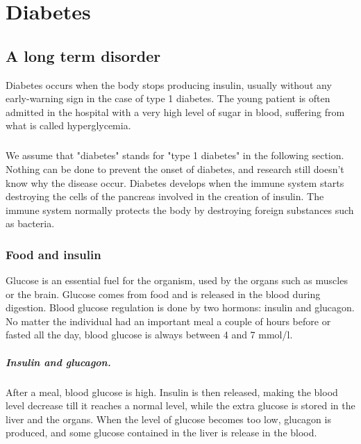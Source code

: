 \chapter{Diabetes}

\section{A long term disorder}%
Diabetes occurs when the body stops producing insulin, usually without any early-warning sign in the case of type 1 diabetes. The young patient is often admitted in the hospital with a very high level of sugar in blood, suffering from what is called hyperglycemia.
\paragraph{}

We assume that "diabetes" stands for "type 1 diabetes" in the following section. Nothing can be done to prevent the onset of diabetes, and research still doesn't know why the disease occur. Diabetes develops when the immune system starts destroying the cells of the pancreas involved in the creation of insulin. The immune system normally protects the body by destroying foreign substances such as bacteria. 

\subsection{Food and insulin}
Glucose is an essential fuel for the organism, used by the organs such as muscles or the brain. Glucose comes from food and is released in the blood during digestion. Blood glucose regulation is done by two hormons: insulin and glucagon. No matter the individual had an important meal a couple of hours before or fasted all the day, blood glucose is always between 4 and 7 mmol/l. 
\paragraph{Insulin and glucagon.} After a meal, blood glucose is high. Insulin is then released, making the blood level decrease till it reaches a normal level, while the extra glucose is stored in the liver and the organs. When the level of glucose becomes too low, glucagon is produced, and some glucose contained in the liver is release in the blood. 

